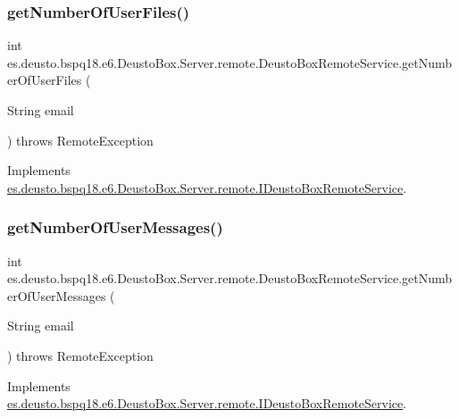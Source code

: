 \subsubsection{\texorpdfstring{get\+Number\+Of\+User\+Files()}{getNumberOfUserFiles()}}
{\footnotesize\ttfamily int es.\+deusto.\+bspq18.\+e6.\+Deusto\+Box.\+Server.\+remote.\+Deusto\+Box\+Remote\+Service.\+get\+Number\+Of\+User\+Files (\begin{DoxyParamCaption}\item[{String}]{email }\end{DoxyParamCaption}) throws Remote\+Exception}



Implements \mbox{\hyperlink{interfacees_1_1deusto_1_1bspq18_1_1e6_1_1_deusto_box_1_1_server_1_1remote_1_1_i_deusto_box_remote_service_a80dac713a05e2f7ef7b8e8ac4aa4b13d}{es.\+deusto.\+bspq18.\+e6.\+Deusto\+Box.\+Server.\+remote.\+I\+Deusto\+Box\+Remote\+Service}}.

\mbox{\label{classes_1_1deusto_1_1bspq18_1_1e6_1_1_deusto_box_1_1_server_1_1remote_1_1_deusto_box_remote_service_a52c001ee4b0b93a416778e4b662da841}} 
\subsubsection{\texorpdfstring{get\+Number\+Of\+User\+Messages()}{getNumberOfUserMessages()}}
{\footnotesize\ttfamily int es.\+deusto.\+bspq18.\+e6.\+Deusto\+Box.\+Server.\+remote.\+Deusto\+Box\+Remote\+Service.\+get\+Number\+Of\+User\+Messages (\begin{DoxyParamCaption}\item[{String}]{email }\end{DoxyParamCaption}) throws Remote\+Exception}



Implements \mbox{\hyperlink{interfacees_1_1deusto_1_1bspq18_1_1e6_1_1_deusto_box_1_1_server_1_1remote_1_1_i_deusto_box_remote_service_a354457645b54345e47ecef75c16ddbd7}{es.\+deusto.\+bspq18.\+e6.\+Deusto\+Box.\+Server.\+remote.\+I\+Deusto\+Box\+Remote\+Service}}.


